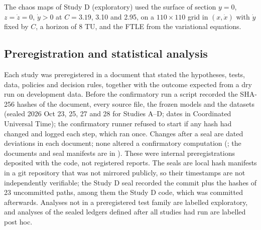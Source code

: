 \documentclass[10pt,letterpaper]{article}
\begin{document}
The chaos maps of Study D (exploratory) used the surface of section $y = 0$, $z = \dot{z} = 0$, $\dot{y} > 0$ at $C = 3.19$, 3.10 and 2.95, on a $110\times110$ grid in $(x,\dot{x})$ with $\dot{y}$ fixed by $C$, a horizon of 8 TU, and the FTLE from the variational equations.

\subsection*{Preregistration and statistical analysis}
Each study was preregistered in a document that stated the hypotheses, tests, data, policies and decision rules, together with the outcome expected from a dry run on development data. Before the confirmatory run a script recorded the SHA-256 hashes of the document, every source file, the frozen models and the datasets (sealed 2026 Oct 23, 25, 27 and 28 for Studies A--D; dates in Coordinated Universal Time); the confirmatory runner refused to start if any hash had changed and logged each step, which ran once. Changes after a seal are dated deviations in each document; none altered a confirmatory computation (; the documents and seal manifests are in ). These were internal preregistrations deposited with the code, not registered reports. The seals are local hash manifests in a git repository that was not mirrored publicly, so their timestamps are not independently verifiable; the Study D seal recorded the commit plus the hashes of 23 uncommitted paths, among them the Study D code, which was committed afterwards. Analyses not in a preregistered test family are labelled exploratory, and analyses of the sealed ledgers defined after all studies had run are labelled post hoc.
\end{document}
